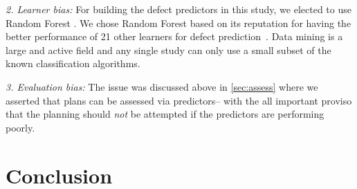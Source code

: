 \documentclass[conference]{IEEEtran}
\newcommand{\tion}[1]{\textsection\ref{sec:#1}}
\begin{document}
{\em 2. Learner bias: } For building the defect predictors in this study, we elected
to use  Random Forest  .
We chose Random Forest based on its reputation for having the better  performance of 
21 other learners for defect prediction~\cite{lessmann}.
Data mining is a
large and active field and any single study can only use a small
subset of the known classification algorithms.  

{\em 3. Evaluation bias:} The issue was discussed above in \tion{assess} where
we asserted that plans can be assessed via predictors-- with the all important
proviso that the planning should {\em not} be attempted if the predictors
are performing poorly.

 




%


\section{Conclusion}
 
 
{}

\end{document}
